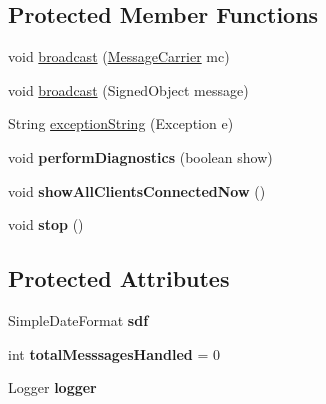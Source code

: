 \subsection*{Protected Member Functions}
\begin{DoxyCompactItemize}
\item 
void \hyperlink{classgov_1_1fnal_1_1ppd_1_1dd_1_1chat_1_1MessagingServer_ae45eb53ec2614d072c92a7f6615cae75}{broadcast} (\hyperlink{classgov_1_1fnal_1_1ppd_1_1dd_1_1chat_1_1MessageCarrier}{Message\-Carrier} mc)
\item 
void \hyperlink{classgov_1_1fnal_1_1ppd_1_1dd_1_1chat_1_1MessagingServer_a658cba9627ce15a7075010447eb0ad57}{broadcast} (Signed\-Object message)
\item 
String \hyperlink{classgov_1_1fnal_1_1ppd_1_1dd_1_1chat_1_1MessagingServer_afe655a915ee116333ee6f1c8331b7929}{exception\-String} (Exception e)
\item 
\hypertarget{classgov_1_1fnal_1_1ppd_1_1dd_1_1chat_1_1MessagingServer_af24f72f6ce9d270c33afb4032d9c968b}{void {\bfseries perform\-Diagnostics} (boolean show)}\label{classgov_1_1fnal_1_1ppd_1_1dd_1_1chat_1_1MessagingServer_af24f72f6ce9d270c33afb4032d9c968b}

\item 
\hypertarget{classgov_1_1fnal_1_1ppd_1_1dd_1_1chat_1_1MessagingServer_a90da887bb782b08af3fb1dbce8c3e502}{void {\bfseries show\-All\-Clients\-Connected\-Now} ()}\label{classgov_1_1fnal_1_1ppd_1_1dd_1_1chat_1_1MessagingServer_a90da887bb782b08af3fb1dbce8c3e502}

\item 
\hypertarget{classgov_1_1fnal_1_1ppd_1_1dd_1_1chat_1_1MessagingServer_a2ab9736895b528ec810dd27eb5761295}{void {\bfseries stop} ()}\label{classgov_1_1fnal_1_1ppd_1_1dd_1_1chat_1_1MessagingServer_a2ab9736895b528ec810dd27eb5761295}

\end{DoxyCompactItemize}
\subsection*{Protected Attributes}
\begin{DoxyCompactItemize}
\item 
\hypertarget{classgov_1_1fnal_1_1ppd_1_1dd_1_1chat_1_1MessagingServer_ac727c375b30722fb0d0a88f27eb97954}{Simple\-Date\-Format {\bfseries sdf}}\label{classgov_1_1fnal_1_1ppd_1_1dd_1_1chat_1_1MessagingServer_ac727c375b30722fb0d0a88f27eb97954}

\item 
\hypertarget{classgov_1_1fnal_1_1ppd_1_1dd_1_1chat_1_1MessagingServer_a6847562b2441991b550f7b3cb7fe8f2d}{int {\bfseries total\-Messsages\-Handled} = 0}\label{classgov_1_1fnal_1_1ppd_1_1dd_1_1chat_1_1MessagingServer_a6847562b2441991b550f7b3cb7fe8f2d}

\item 
\hypertarget{classgov_1_1fnal_1_1ppd_1_1dd_1_1chat_1_1MessagingServer_a723da061c3ef4f584162110653adcbe2}{Logger {\bfseries logger}}\label{classgov_1_1fnal_1_1ppd_1_1dd_1_1chat_1_1MessagingServer_a723da061c3ef4f584162110653adcbe2}

\end{DoxyCompactItemize}


